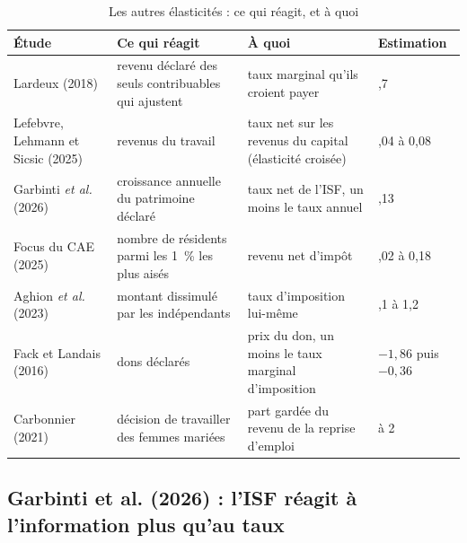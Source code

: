 \documentclass[11pt,a4paper]{article}
\renewcommand{\arraystretch}{1.22}
\begin{document}
\begin{table}[htbp]
\caption{Les autres élasticités : ce qui réagit, et à quoi}
\label{tab:autres}
\footnotesize
\renewcommand{\arraystretch}{1.25}
\begin{tabularx}{\linewidth}{@{}>{\raggedright\arraybackslash}p{3.1cm}
  >{\raggedright\arraybackslash}X>{\raggedright\arraybackslash}X>{\raggedleft\arraybackslash}p{1.9cm}@{}}
\toprule
\textbf{Étude} & \textbf{Ce qui réagit} & \textbf{À quoi} & \textbf{Estimation}\\
\midrule
Lardeux (2018) & revenu déclaré des seuls contribuables qui ajustent & taux marginal qu'ils croient
payer & 0,7\\
Lefebvre, Lehmann et Sicsic (2025) & revenus du travail & taux net sur les revenus du capital
(élasticité croisée) & 0,04 à 0,08\\
Garbinti \emph{et al.} (2026) & croissance annuelle du patrimoine déclaré & taux net de l'ISF, un
moins le taux annuel & 0,13\\
Focus du CAE (2025) & nombre de résidents parmi les 1~\% les plus aisés & revenu net d'impôt & 0,02
à 0,18\\
Aghion \emph{et al.} (2023) & montant dissimulé par les indépendants & taux d'imposition lui-même &
1,1 à 1,2\\
Fack et Landais (2016) & dons déclarés & prix du don, un moins le taux marginal d'imposition & $-1{,}86$
puis $-0{,}36$\\
Carbonnier (2021) & décision de travailler des femmes mariées & part gardée du revenu de la reprise
d'emploi & 1 à 2\\
\bottomrule
\end{tabularx}
\end{table}

\subsection{Garbinti et al. (2026) : l'ISF réagit à l'information plus qu'au taux}
\end{document}
